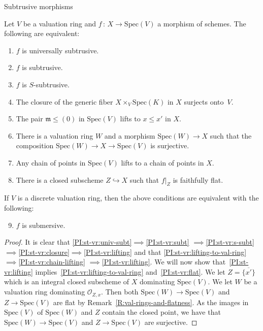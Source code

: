 \documentclass[a4paper,twoside,11pt]{amsart}[2009/07/02] %
\newcommand{\pref}[1]{\eqref{#1}}
\newcommand{\inj}{\hookrightarrow}
\newcommand{\map}[3]{#1\,:\, #2\rightarrow #3}
\newcommand{\Spec}{\mathrm{Spec}}
\newcommand\im{\mathfrak{m}} %
\newcommand\sO{\mathcal{O}} %
\begin{document}
\begin{section}{Subtrusive morphisms}
\begin{proposition}
\label{P:subtrusive-over-valuation-ring}
Let $V$ be a valuation ring and $\map{f}{X}{\Spec(V)}$ a morphism of
schemes. The following are equivalent:
%
\begin{enumerate}
\item $f$ is universally subtrusive.\label{PI:st-vr:univ-subt}
\item $f$ is subtrusive.\label{PI:st-vr:subt}
\item $f$ is $S$-subtrusive.\label{PI:st-vr:s-subt}
\item The closure of the generic fiber $X\times_V \Spec(K)$ in $X$
surjects onto~$V$.\label{PI:st-vr:closure}
\item The pair $\im\leq (0)$ in $\Spec(V)$ lifts to $x\leq x'$
in $X$.\label{PI:st-vr:lifting}
\item There is a valuation ring $W$ and a morphism $\Spec(W)\to X$ such that
the composition $\Spec(W)\to X\to \Spec(V)$ is surjective.
\label{PI:st-vr:lifting-to-val-ring}
\item Any chain of points in $\Spec(V)$ lifts to a chain of points in
$X$.\label{PI:st-vr:chain-lifting}
\item There is a closed subscheme $Z\inj X$ such that $f|_Z$ is faithfully
flat.\label{PI:st-vr:flat}
\end{enumerate}
%
If $V$ is a discrete valuation ring, then the above conditions are equivalent
with the following:
%
\begin{enumerate}\setcounter{enumi}{8}
\item $f$ is submersive.\label{PI:st-vr:subm}
\end{enumerate}
%
\end{proposition}
\begin{proof}
It is clear that \ref{PI:st-vr:univ-subt}$\implies$\ref{PI:st-vr:subt}%
$\implies$\ref{PI:st-vr:s-subt}
$\implies$\ref{PI:st-vr:closure}$\implies$\ref{PI:st-vr:lifting} and that
\ref{PI:st-vr:lifting-to-val-ring}$\implies$\ref{PI:st-vr:chain-lifting}%
$\implies$\ref{PI:st-vr:lifting}. We will now show that~\ref{PI:st-vr:lifting}
implies~\ref{PI:st-vr:lifting-to-val-ring} and~\ref{PI:st-vr:flat}.
%
We let $Z=\overline{\{x'\}}$ which is
an integral closed subscheme of $X$ dominating $\Spec(V)$. We let $W$ be a
valuation ring dominating $\sO_{Z,x}$. Then both $\Spec(W)\to\Spec(V)$ and
$Z\to\Spec(V)$ are flat by Remark~\pref{R:val-rings-and-flatness}. As
the images in $\Spec(V)$ of $\Spec(W)$ and $Z$ contain the closed point,
we have that $\Spec(W)\to\Spec(V)$ and $Z\to\Spec(V)$ are surjective.


\end{proof}
\end{section}
\end{document}
